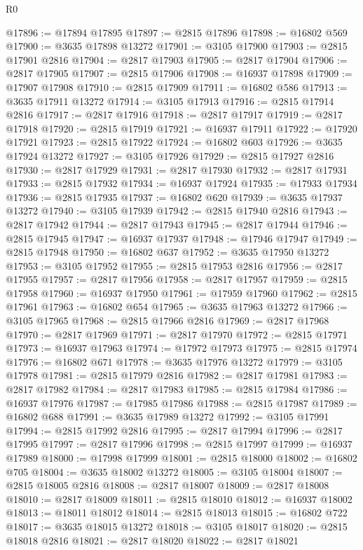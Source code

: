 \begin{lexlean}{R0}
\begin{coremodule}
@17896 := @17894 @17895
@17897 := @2815 @17896
@17898 := @16802 @569
@17900 := @3635 @17898 @13272
@17901 := @3105 @17900
@17903 := @2815 @17901 @2816
@17904 := @2817 @17903
@17905 := @2817 @17904
@17906 := @2817 @17905
@17907 := @2815 @17906
@17908 := @16937 @17898
@17909 := @17907 @17908
@17910 := @2815 @17909
@17911 := @16802 @586
@17913 := @3635 @17911 @13272
@17914 := @3105 @17913
@17916 := @2815 @17914 @2816
@17917 := @2817 @17916
@17918 := @2817 @17917
@17919 := @2817 @17918
@17920 := @2815 @17919
@17921 := @16937 @17911
@17922 := @17920 @17921
@17923 := @2815 @17922
@17924 := @16802 @603
@17926 := @3635 @17924 @13272
@17927 := @3105 @17926
@17929 := @2815 @17927 @2816
@17930 := @2817 @17929
@17931 := @2817 @17930
@17932 := @2817 @17931
@17933 := @2815 @17932
@17934 := @16937 @17924
@17935 := @17933 @17934
@17936 := @2815 @17935
@17937 := @16802 @620
@17939 := @3635 @17937 @13272
@17940 := @3105 @17939
@17942 := @2815 @17940 @2816
@17943 := @2817 @17942
@17944 := @2817 @17943
@17945 := @2817 @17944
@17946 := @2815 @17945
@17947 := @16937 @17937
@17948 := @17946 @17947
@17949 := @2815 @17948
@17950 := @16802 @637
@17952 := @3635 @17950 @13272
@17953 := @3105 @17952
@17955 := @2815 @17953 @2816
@17956 := @2817 @17955
@17957 := @2817 @17956
@17958 := @2817 @17957
@17959 := @2815 @17958
@17960 := @16937 @17950
@17961 := @17959 @17960
@17962 := @2815 @17961
@17963 := @16802 @654
@17965 := @3635 @17963 @13272
@17966 := @3105 @17965
@17968 := @2815 @17966 @2816
@17969 := @2817 @17968
@17970 := @2817 @17969
@17971 := @2817 @17970
@17972 := @2815 @17971
@17973 := @16937 @17963
@17974 := @17972 @17973
@17975 := @2815 @17974
@17976 := @16802 @671
@17978 := @3635 @17976 @13272
@17979 := @3105 @17978
@17981 := @2815 @17979 @2816
@17982 := @2817 @17981
@17983 := @2817 @17982
@17984 := @2817 @17983
@17985 := @2815 @17984
@17986 := @16937 @17976
@17987 := @17985 @17986
@17988 := @2815 @17987
@17989 := @16802 @688
@17991 := @3635 @17989 @13272
@17992 := @3105 @17991
@17994 := @2815 @17992 @2816
@17995 := @2817 @17994
@17996 := @2817 @17995
@17997 := @2817 @17996
@17998 := @2815 @17997
@17999 := @16937 @17989
@18000 := @17998 @17999
@18001 := @2815 @18000
@18002 := @16802 @705
@18004 := @3635 @18002 @13272
@18005 := @3105 @18004
@18007 := @2815 @18005 @2816
@18008 := @2817 @18007
@18009 := @2817 @18008
@18010 := @2817 @18009
@18011 := @2815 @18010
@18012 := @16937 @18002
@18013 := @18011 @18012
@18014 := @2815 @18013
@18015 := @16802 @722
@18017 := @3635 @18015 @13272
@18018 := @3105 @18017
@18020 := @2815 @18018 @2816
@18021 := @2817 @18020
@18022 := @2817 @18021

\end{coremodule}
\end{lexlean}
